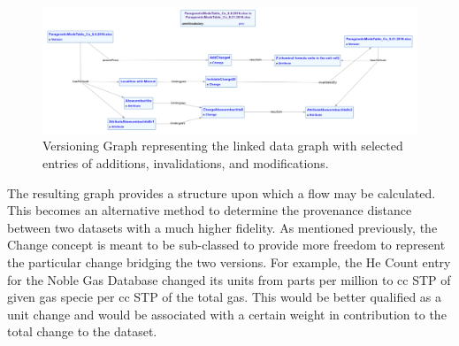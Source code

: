 \begin{figure}
	\centering
	\includegraphics[scale=0.23]{figures/VersioningGraph.png}
	\caption{Versioning Graph representing the linked data graph with selected entries of additions, invalidations, and modifications. }
	\label{CopperGraphVerGraph}
\end{figure}

The resulting graph provides a structure upon which a flow may be calculated.  This becomes an alternative method to determine the provenance distance between two datasets with a much higher fidelity.  As mentioned previously, the Change concept is meant to be sub-classed to provide more freedom to represent the particular change bridging the two versions.  For example, the He Count entry for the Noble Gas Database changed its units from parts per million to cc STP of given gas specie per cc STP of the total gas.  This would be better qualified as a unit change and would be associated with a certain weight in contribution to the total change to the dataset.